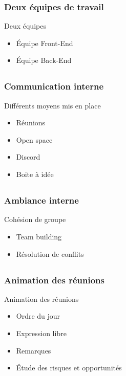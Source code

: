 \documentclass[compress,xcolor=dvipsnames]{beamer}
\begin{document}
\begin{frame}
\frametitle{Deux équipes de travail}
\begin{block}{Deux équipes}
\begin{itemize}
	\item Équipe Front-End
	\item Équipe Back-End
\end{itemize}
\end{block}
\end{frame}


\subsection{}
\begin{frame}
\frametitle{Communication interne}
\begin{block}{Différents moyens mis en place}
\begin{itemize}
	\item Réunions
	\item Open space
	\item Discord
	\item Boite à idée
\end{itemize}
\end{block}
\end{frame}


\subsection{}
\begin{frame}
\frametitle{Ambiance interne}
\begin{block}{Cohésion de groupe}
\begin{itemize}
	\item Team building
	\item Résolution de conflits
\end{itemize}
\end{block}
\end{frame}


\subsection{}
\begin{frame}
\frametitle{Animation des réunions}
\begin{block}{Animation des réunions}
\begin{itemize}
	\item Ordre du jour
	\item Expression libre
	\item Remarques
	\item Étude des risques et opportunités
\end{itemize}
\end{block}
\end{frame}
\end{document}

